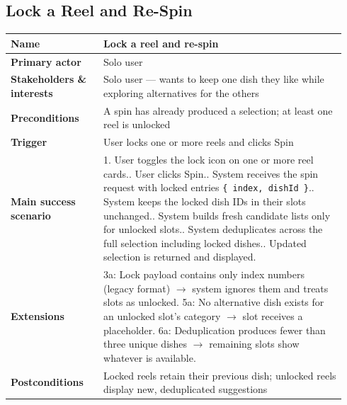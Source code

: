 \documentclass[sigconf]{acmart}
\begin{document}
\subsection*{Lock a Reel and Re-Spin}
{\footnotesize
\begin{supertabular}{@{}p{0.26\linewidth}p{0.68\linewidth}@{}}
\textbf{Name} & Lock a reel and re-spin \\
\hline
\textbf{Primary actor} & Solo user \\
\hline
\textbf{Stakeholders \& interests} & Solo user --- wants to keep one dish they like while exploring alternatives for the others \\
\hline
\textbf{Preconditions} & A spin has already produced a selection; at least one reel is unlocked \\
\hline
\textbf{Trigger} & User locks one or more reels and clicks Spin \\
\hline
\textbf{Main success scenario} & 1. User toggles the lock icon on one or more reel cards.. User clicks Spin.. System receives the spin request with locked entries \texttt{\{ index, dishId \}}.. System keeps the locked dish IDs in their slots unchanged.. System builds fresh candidate lists only for unlocked slots.. System deduplicates across the full selection including locked dishes.. Updated selection is returned and displayed. \\
\hline
\textbf{Extensions} & 3a: Lock payload contains only index numbers (legacy format) $\rightarrow$ system ignores them and treats slots as unlocked.\newline
5a: No alternative dish exists for an unlocked slot's category $\rightarrow$ slot receives a placeholder.\newline
6a: Deduplication produces fewer than three unique dishes $\rightarrow$ remaining slots show whatever is available. \\
\hline
\textbf{Postconditions} & Locked reels retain their previous dish; unlocked reels display new, deduplicated suggestions \\
\end{supertabular}
}
\end{document}
